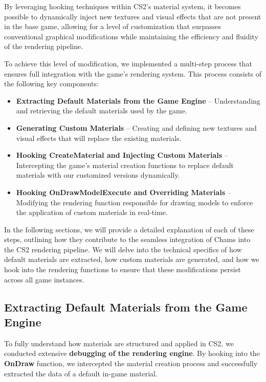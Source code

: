 By leveraging hooking techniques within CS2’s material system, it becomes possible to dynamically inject new textures and visual effects that are not present in the base game, allowing for a level of customization that surpasses conventional graphical modifications while maintaining the efficiency and fluidity of the rendering pipeline.

To achieve this level of modification, we implemented a multi-step process that ensures full integration with the game's rendering system. This process consists of the following key components:

\begin{itemize}
    \item \textbf{Extracting Default Materials from the Game Engine} – Understanding and retrieving the default materials used by the game.
    \item \textbf{Generating Custom Materials} – Creating and defining new textures and visual effects that will replace the existing materials.
    \item \textbf{Hooking CreateMaterial and Injecting Custom Materials} – Intercepting the game's material creation functions to replace default materials with our customized versions dynamically.
    \item \textbf{Hooking OnDrawModelExecute and Overriding Materials} – Modifying the rendering function responsible for drawing models to enforce the application of custom materials in real-time.
\end{itemize}

In the following sections, we will provide a detailed explanation of each of these steps, outlining how they contribute to the seamless integration of Chams into the CS2 rendering pipeline. We will delve into the technical specifics of how default materials are extracted, how custom materials are generated, and how we hook into the rendering functions to ensure that these modifications persist across all game instances.



\subsection{Extracting Default Materials from the Game Engine}

To fully understand how materials are structured and applied in CS2, we conducted extensive \textbf{debugging of the rendering engine}. By hooking into the \textbf{OnDraw} function, we intercepted the material creation process and successfully extracted the data of a default in-game material.

